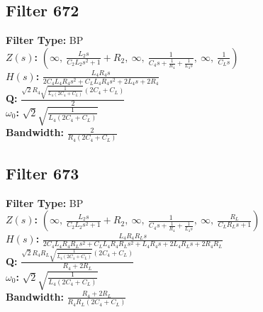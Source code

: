 \documentclass{article}
\begin{document}
\subsection*{Filter 672}
\textbf{Filter Type:} BP \\ 
\textbf{$Z(s)$:} $\left( \infty, \  \frac{L_{2} s}{C_{2} L_{2} s^{2} + 1} + R_{2}, \  \infty, \  \frac{1}{C_{4} s + \frac{1}{R_{4}} + \frac{1}{L_{4} s}}, \  \infty, \  \frac{1}{C_{L} s}\right)$ \\ 
\textbf{$H(s)$:} $\frac{L_{4} R_{4} s}{2 C_{4} L_{4} R_{4} s^{2} + C_{L} L_{4} R_{4} s^{2} + 2 L_{4} s + 2 R_{4}}$ \\ 
\textbf{Q:} $\frac{\sqrt{2} R_{4} \sqrt{\frac{1}{L_{4} \left(2 C_{4} + C_{L}\right)}} \left(2 C_{4} + C_{L}\right)}{2}$ \\ 
\textbf{$\omega_0$:} $\sqrt{2} \sqrt{\frac{1}{L_{4} \left(2 C_{4} + C_{L}\right)}}$ \\ 
\textbf{Bandwidth:} $\frac{2}{R_{4} \left(2 C_{4} + C_{L}\right)}$ \\ 
\subsection*{Filter 673}
\textbf{Filter Type:} BP \\ 
\textbf{$Z(s)$:} $\left( \infty, \  \frac{L_{2} s}{C_{2} L_{2} s^{2} + 1} + R_{2}, \  \infty, \  \frac{1}{C_{4} s + \frac{1}{R_{4}} + \frac{1}{L_{4} s}}, \  \infty, \  \frac{R_{L}}{C_{L} R_{L} s + 1}\right)$ \\ 
\textbf{$H(s)$:} $\frac{L_{4} R_{4} R_{L} s}{2 C_{4} L_{4} R_{4} R_{L} s^{2} + C_{L} L_{4} R_{4} R_{L} s^{2} + L_{4} R_{4} s + 2 L_{4} R_{L} s + 2 R_{4} R_{L}}$ \\ 
\textbf{Q:} $\frac{\sqrt{2} R_{4} R_{L} \sqrt{\frac{1}{L_{4} \left(2 C_{4} + C_{L}\right)}} \left(2 C_{4} + C_{L}\right)}{R_{4} + 2 R_{L}}$ \\ 
\textbf{$\omega_0$:} $\sqrt{2} \sqrt{\frac{1}{L_{4} \left(2 C_{4} + C_{L}\right)}}$ \\ 
\textbf{Bandwidth:} $\frac{R_{4} + 2 R_{L}}{R_{4} R_{L} \left(2 C_{4} + C_{L}\right)}$ \\ 
\end{document}
